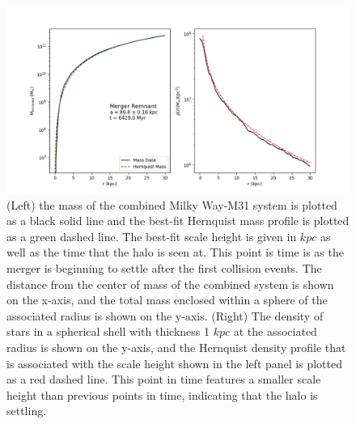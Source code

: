 \documentclass[linenumbers]{aastex631}
\begin{document}
\begin{figure}
    \centering
    \includegraphics[width=\textwidth]{Snap450withConcat.png}
    \caption{(Left) the mass of the combined Milky Way-M31 system is plotted as a black solid line and the best-fit Hernquist mass profile is plotted as a green dashed line. The best-fit scale height is given in $kpc$ as well as the time that the halo is seen at. This point is time is as the merger is beginning to settle after the first collision events. The distance from the center of mass of the combined system is shown on the x-axis, and the total mass enclosed within a sphere of the associated radius is shown on the y-axis. (Right) The density of stars in a spherical shell with thickness 1 $kpc$ at the associated radius is shown on the y-axis, and the Hernquist density profile that is associated with the scale height shown in the left panel is plotted as a red dashed line. This point in time features a smaller scale height than previous points in time, indicating that the halo is settling.}
    \label{fig:450}
\end{figure}
\end{document}

